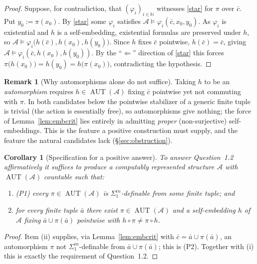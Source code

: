 \documentclass[12pt,fullpage]{article}
\newtheorem{corollary}[theorem]{Corollary}
\theoremstyle{definition}
\newtheorem{remark}[theorem]{Remark}
\newcommand{\A}{\mathcal{A}}
\newcommand{\N}{\mathbb{N}}
\newcommand{\AUT}{\operatorname{AUT}}
\renewcommand{\phi}{\varphi}
\begin{document}
\begin{proof}
Suppose, for contradiction, that $(\phi_i)_{i\in\N}$ witnesses \eqref{star} for
$\pi$ over $\bar c$.  Put $y_0:=\pi(x_0)$.  By \eqref{star} some $\phi_i$
satisfies $\A\models\phi_i(\bar c,x_0,y_0)$.  As $\phi_i$ is existential and $h$
is a self-embedding, existential formulas are preserved under $h$, so
$\A\models\phi_i\bigl(h(\bar c),h(x_0),h(y_0)\bigr)$.  Since $h$ fixes $\bar c$
pointwise, $h(\bar c)=\bar c$, giving $\A\models\phi_i(\bar c,h(x_0),h(y_0))$.
By the ``$\Leftarrow$'' direction of \eqref{star} this forces
$\pi\bigl(h(x_0)\bigr)=h(y_0)=h\bigl(\pi(x_0)\bigr)$, contradicting the
hypothesis.
\end{proof}

\begin{remark}[Why automorphisms alone do not suffice]\label{rem:autos}
Taking $h$ to be an \emph{automorphism} requires $h\in\AUT(\A)$ fixing $\bar c$
pointwise yet not commuting with $\pi$.  In both candidates below the pointwise
stabilizer of a generic finite tuple is trivial (the action is essentially
free), so automorphisms give nothing; the force of Lemma~\ref{lem:embcrit} lies
entirely in admitting \emph{proper} (non-surjective) self-embeddings.  This is
the feature a positive construction must supply, and the feature the natural
candidates lack (\S\ref{sec:obstruction}).
\end{remark}

\begin{corollary}[Specification for a positive answer]\label{cor:spec}
To answer Question~1.2 affirmatively it suffices to produce a computably
represented structure $\A$ with $\AUT(\A)$ countable such that:
\begin{enumerate}[label=\textup{(\roman*)}]
\item \textup{(P1)} every $\pi\in\AUT(\A)$ is $\Sigma^{in}_1$-definable from
  some finite tuple; and
\item for every finite tuple $\bar a$ there exist $\pi\in\AUT(\A)$ and a
  self-embedding $h$ of $\A$ fixing $\bar a\cup\pi(\bar a)$ pointwise with
  $h\circ\pi\neq\pi\circ h$.
\end{enumerate}
\end{corollary}

\begin{proof}
Item (ii) supplies, via Lemma~\ref{lem:embcrit} with
$\bar c=\bar a\cup\pi(\bar a)$, an automorphism $\pi$ not
$\Sigma^{in}_1$-definable from $\bar a\cup\pi(\bar a)$; this is (P2).  Together
with (i) this is exactly the requirement of Question~1.2.
\end{proof}
\end{document}
